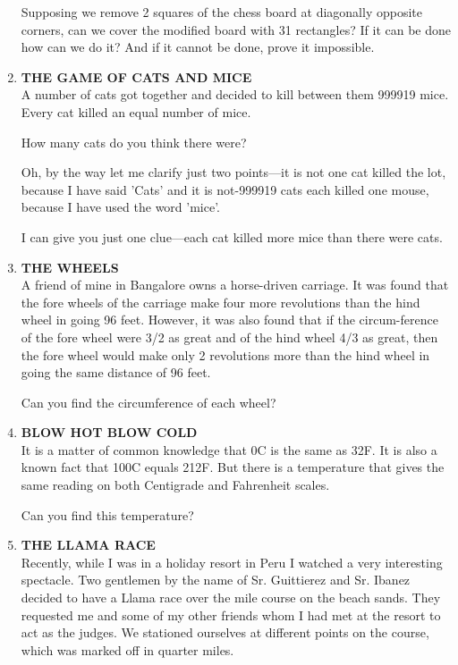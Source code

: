 \documentclass[12pt]{article}
\begin{document}
\begin{enumerate}
Supposing  we remove  2 squares  of the chess  board  at diagonally  opposite  corners,  can  we cover  the modified board  with  31 rectangles?  If it can  be done  how  can we do it? And  if it cannot  be  done,  prove  it impossible. 
%
\item \textbf{THE  GAME  OF CATS  AND  MICE} \\
A number  of cats  got  together  and  decided  to kill between  them  999919  mice.  Every  cat  killed  an equal number  of mice. 

How  many  cats  do you think  there  were? 

Oh, by the  way  let me  clarify  just two  points—it  is not one cat killed  the lot, because  I have  said  'Cats'  and it is not-999919  cats  each  killed  one mouse,  because  I have used the word  'mice'. 

I can  give  you  just  one  clue—each  cat killed  more mice  than  there  were  cats. 
%
\item \textbf{THE  WHEELS} \\
A friend  of mine  in Bangalore  owns  a horse-driven carriage.  It was  found  that  the fore  wheels  of the carriage make  four  more  revolutions  than  the hind  wheel  in going 96 feet.  However,  it was  also  found  that  if the circum-ference  of the fore  wheel  were  3/2 as great  and of the hind wheel  4/3 as  great,  then  the fore  wheel  would  make  only 2 revolutions  more  than  the hind  wheel  in going  the same distance  of 96 feet. 

Can you find  the circumference  of each  wheel? 
%
\item \textbf{BLOW  HOT  BLOW  COLD} \\
It is a matter  of common  knowledge  that  0C  is the same  as 32F.  It is also  a known  fact  that  100C  equals 212F.  But  there  is a temperature  that  gives  the same reading  on both  Centigrade  and Fahrenheit  scales. 

Can you find  this temperature? 
%
\item \textbf{THE  LLAMA  RACE} \\
Recently,  while  I was  in a holiday  resort  in Peru  I watched  a very  interesting  spectacle.  Two  gentlemen  by the name  of Sr. Guittierez  and Sr. Ibanez  decided  to have a Llama  race  over  the  mile  course  on the beach  sands. They  requested  me and some  of my  other  friends  whom I had met at the resort  to act as the judges.  We  stationed ourselves  at different  points  on the  course,  which  was marked  off in quarter  miles. 


\end{enumerate}
\end{document}
